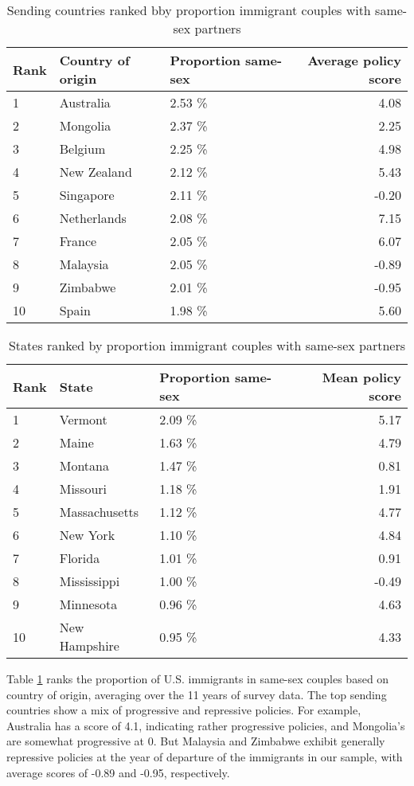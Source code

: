 \documentclass[11pt,]{article}
\begin{document}
\begin{table}

\caption{\label{tab:country-tab}Sending countries ranked bby proportion immigrant couples with same-sex partners}
\centering
\begin{tabular}[t]{lllr}
\toprule
Rank & Country of origin & Proportion same-sex & Average policy score\\
\midrule
1 & Australia & 2.53 \% & 4.08\\
2 & Mongolia & 2.37 \% & 2.25\\
3 & Belgium & 2.25 \% & 4.98\\
4 & New Zealand & 2.12 \% & 5.43\\
5 & Singapore & 2.11 \% & -0.20\\
6 & Netherlands & 2.08 \% & 7.15\\
7 & France & 2.05 \% & 6.07\\
8 & Malaysia & 2.05 \% & -0.89\\
9 & Zimbabwe & 2.01 \% & -0.95\\
10 & Spain & 1.98 \% & 5.60\\
\bottomrule
\end{tabular}
\end{table}

\begin{table}

\caption{\label{tab:state-tab}States ranked by proportion immigrant couples with same-sex partners}
\centering
\begin{tabular}[t]{lllr}
\toprule
Rank & State & Proportion same-sex & Mean policy score\\
\midrule
1 & Vermont & 2.09 \% & 5.17\\
2 & Maine & 1.63 \% & 4.79\\
3 & Montana & 1.47 \% & 0.81\\
4 & Missouri & 1.18 \% & 1.91\\
5 & Massachusetts & 1.12 \% & 4.77\\
6 & New York & 1.10 \% & 4.84\\
7 & Florida & 1.01 \% & 0.91\\
8 & Mississippi & 1.00 \% & -0.49\\
9 & Minnesota & 0.96 \% & 4.63\\
10 & New Hampshire & 0.95 \% & 4.33\\
\bottomrule
\end{tabular}
\end{table}

Table \ref{tab:country-tab} ranks the proportion of U.S. immigrants in same-sex couples based on country of origin, averaging over the 11 years of survey data. The top sending countries show a mix of progressive and repressive policies. For example, Australia has a score of 4.1, indicating rather progressive policies, and Mongolia's are somewhat progressive at 0. But Malaysia and Zimbabwe exhibit generally repressive policies at the year of departure of the immigrants in our sample, with average scores of -0.89 and -0.95, respectively.
\end{document}
